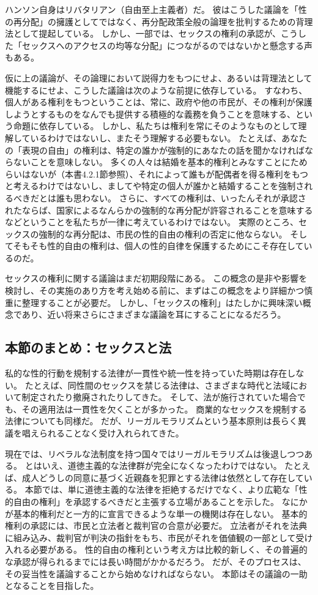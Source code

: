 \documentclass[paper=a4,book,openany]{jlreq}
\begin{document}
ハンソン自身はリバタリアン（自由至上主義者）だ。
彼はこうした議論を「性の再分配」の擁護としてではなく、再分配政策全般の論理を批判するための背理法として提起している。
しかし、一部では、セックスの権利の承認が、こうした「セックスへのアクセスの均等な分配」につながるのではないかと懸念する声もある。

仮に上の議論が、その論理において説得力をもつにせよ、あるいは背理法として機能するにせよ、こうした議論は次のような前提に依存している。
すなわち、個人がある権利をもつということは、常に、政府や他の市民が、その権利が保護しようとするものをなんでも提供する積極的な義務を負うことを意味する、という命題に依存している。
しかし、私たちは権利を常にそのようなものとして理解しているわけではないし、またそう理解する必要もない。
たとえば、あなたの「表現の自由」の権利は、特定の誰かが強制的にあなたの話を聞かなければならないことを意味しない。
多くの人々は結婚を基本的権利とみなすことにためらいはないが（本書4.2.1節参照）、それによって誰もが配偶者を得る権利をもつと考えるわけではないし、ましてや特定の個人が誰かと結婚することを強制されるべきだとは誰も思わない。
さらに、すべての権利は、いったんそれが承認されたならば、国家によるなんらかの強制的な再分配が許容されることを意味するなどということを私たちが一律に考えているわけではない。
実際のところ、セックスの強制的な再分配は、市民の性的自由の権利の否定に他ならない。
そしてそもそも性的自由の権利は、個人の性的自律を保護するためにこそ存在しているのだ。

セックスの権利に関する議論はまだ初期段階にある。
この概念の是非や影響を検討し、その実施のあり方を考え始める前に、まずはこの概念をより詳細かつ慎重に整理することが必要だ。
しかし、「セックスの権利」はたしかに興味深い概念であり、近い将来さらにさまざまな議論を耳にすることになるだろう。

\subsection{本節のまとめ：セックスと法}

私的な性的行動を規制する法律が一貫性や統一性を持っていた時期は存在しない。
たとえば、同性間のセックスを禁じる法律は、さまざまな時代と法域において制定されたり撤廃されたりしてきた。
そして、法が施行されていた場合でも、その適用法は一貫性を欠くことが多かった。
商業的なセックスを規制する法律についても同様だ。
だが、リーガルモラリズムという基本原則は長らく異議を唱えられることなく受け入れられてきた。

現在では、リベラルな法制度を持つ国々ではリーガルモラリズムは後退しつつある。
とはいえ、道徳主義的な法律群が完全になくなったわけではない。
たとえば、成人どうしの同意に基づく近親姦を犯罪とする法律は依然として存在している。
本節では、単に道徳主義的な法律を拒絶するだけでなく、より広範な「性的自由の権利」を承認するべきだと主張する立場があることを示した。
なにかが基本的権利だと一方的に宣言できるような単一の機関は存在しない。
基本的権利の承認には、市民と立法者と裁判官の合意が必要だ。
立法者がそれを法典に組み込み、裁判官が判決の指針をもち、市民がそれを価値観の一部として受け入れる必要がある。
性的自由の権利という考え方は比較的新しく、その普遍的な承認が得られるまでには長い時間がかかるだろう。
だが、そのプロセスは、その妥当性を議論することから始めなければならない。
本節はその議論の一助となることを目指した。
\end{document}
